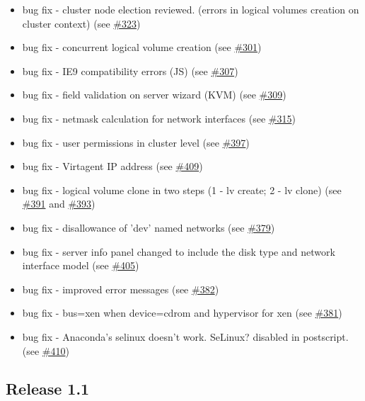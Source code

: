 \begin{itemize}
\item bug fix - cluster node election reviewed. (errors in logical volumes creation on cluster context) (see \href{https://srcmaster.eurotux.com/pm/p/etva/ticket/323}{\#323})
\item bug fix - concurrent logical volume creation (see \href{https://srcmaster.eurotux.com/pm/p/etva/ticket/301}{\#301})
\item bug fix - IE9 compatibility errors (JS) (see \href{https://srcmaster.eurotux.com/pm/p/etva/ticket/307}{\#307})
\item bug fix - field validation on server wizard (KVM) (see \href{https://srcmaster.eurotux.com/pm/p/etva/ticket/309}{\#309})
\item bug fix - netmask calculation for network interfaces (see \href{https://srcmaster.eurotux.com/pm/p/etva/ticket/315}{\#315})
\item bug fix - user permissions in cluster level (see \href{https://srcmaster.eurotux.com/pm/p/etva/ticket/397}{\#397})
\item bug fix - Virtagent IP address (see \href{https://srcmaster.eurotux.com/pm/p/etva/ticket/409}{\#409})
\item bug fix - logical volume clone in two steps (1 - lv create; 2 - lv clone) (see \href{https://srcmaster.eurotux.com/pm/p/etva/ticket/391}{\#391} and \href{https://srcmaster.eurotux.com/pm/p/etva/ticket/393}{\#393})
\item bug fix - disallowance of 'dev' named networks (see \href{https://srcmaster.eurotux.com/pm/p/etva/ticket/379}{\#379})
\item bug fix - server info panel changed to include the disk type and network interface model (see \href{https://srcmaster.eurotux.com/pm/p/etva/ticket/405}{\#405})
\item bug fix - improved error messages (see \href{https://srcmaster.eurotux.com/pm/p/etva/ticket/382}{\#382})
\item bug fix - bus=xen when device=cdrom and hypervisor for xen (see \href{https://srcmaster.eurotux.com/pm/p/etva/ticket/381}{\#381})
\item bug fix - Anaconda's selinux doesn't work. SeLinux? disabled in postscript. (see \href{https://srcmaster.eurotux.com/pm/p/etva/ticket/410}{\#410})
\end{itemize}

\subsection{Release 1.1}

